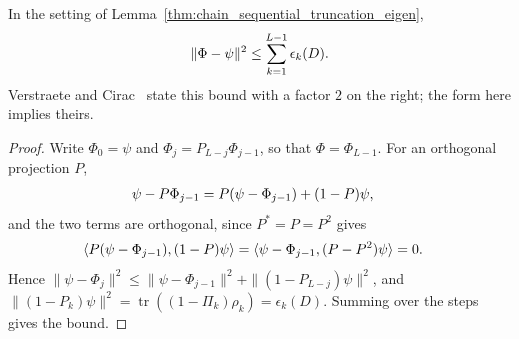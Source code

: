 \begin{theorem}
    \label{thm:chain_sequential_truncation_sq}
    \leanok
    In the setting of Lemma~\ref{thm:chain_sequential_truncation_eigen},
    \begin{align}
        \|\Phi-\psi\|^2\le\sum_{k=1}^{L-1}\epsilon_k(D). \notag
    \end{align}
    Verstraete and Cirac~\cite{VerstraeteCirac2006Faithfully} state this
    bound with a factor $2$ on the right; the form here implies theirs.
\end{theorem}
\begin{proof}
    \leanok
    Write $\Phi_0=\psi$ and $\Phi_j=P_{L-j}\Phi_{j-1}$, so that
    $\Phi=\Phi_{L-1}$. For an orthogonal projection $P$,
    \begin{align}
        \psi-P\Phi_{j-1} & =P(\psi-\Phi_{j-1})+(1-P)\psi, \notag
    \end{align}
    and the two terms are orthogonal, since $P^*=P=P^2$ gives
    \begin{align}
        \langle P(\psi-\Phi_{j-1}),(1-P)\psi\rangle
         & =\langle\psi-\Phi_{j-1},(P-P^2)\psi\rangle=0. \notag
    \end{align}
    Hence
    $\|\psi-\Phi_j\|^2\le\|\psi-\Phi_{j-1}\|^2+\|(1-P_{L-j})\psi\|^2$,
    and $\|(1-P_k)\psi\|^2=\operatorname{tr}((1-\Pi_k)\rho_k)=\epsilon_k(D)$.
    Summing over the steps gives the bound.
\end{proof}

